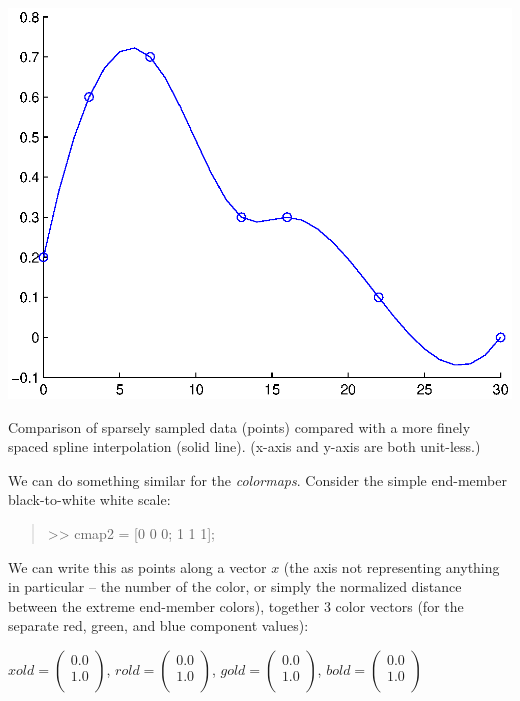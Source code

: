 \documentclass{tufte-book} %
\newenvironment{docspec}{\begin{quotation}\ttfamily\parskip0pt\parindent0pt\ignorespaces}{\end{quotation}}
\begin{document}
\begin{marginfigure}[0.75in]
\includegraphics[width=\linewidth]{ch3-interp1.eps}
\caption{Comparison of sparsely sampled data (points) compared with a more finely spaced spline interpolation (solid line). (x-axis and y-axis are both unit-less.)}
\label{fig:ch3-interp1}
\end{marginfigure}

We can do something similar for the \textit{colormaps}. Consider the simple end-member black-to-white white scale:

\begin{docspec}
>> cmap2 = [0 0 0; 1 1 1];
\end{docspec}

\noindent We can write this as points along a vector \(x\) (the axis not representing anything in particular -- the number of the color, or simply the normalized distance between the extreme end-member colors), together 3 color vectors (for the separate red, green, and blue  component values):

\vspace{2mm}
\(xold = \begin{pmatrix}0.0 \\
1.0 \\
\end{pmatrix}\),
\(rold = \begin{pmatrix}0.0 \\
1.0 \\
\end{pmatrix}\),
\(gold = \begin{pmatrix}0.0 \\
1.0 \\
\end{pmatrix}\),
\(bold = \begin{pmatrix}0.0 \\
1.0 \\
\end{pmatrix}\)
\vspace{2mm}
\end{document}
